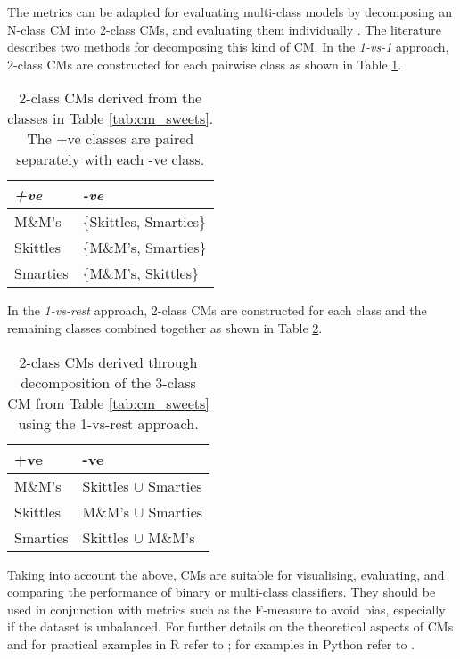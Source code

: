 The metrics can be adapted for evaluating multi-class models by decomposing an N-class CM into 2-class CMs, and evaluating them individually \citep{stager2006dealing}. The literature describes two methods for decomposing this kind of  CM. In the \textit{1-vs-1} approach, 2-class CMs are constructed for each pairwise class as shown in Table \ref{tab:cm_1vs1}.

\begin{table}[ht]
  \centering
  \selectfont
  \begin{tabular}{ll}
    \toprule
    \textit{+ve} & \textit{-ve} \\
    \midrule
    M\&M's       & $\{$Skittles, Smarties$\}$ \\
    Skittles     & $\{$M\&M's, Smarties$\}$ \\
    Smarties     & $\{$M\&M's, Skittles$\}$ \\
    \bottomrule
  \end{tabular}
  \caption{2-class CMs derived from the classes in Table \ref{tab:cm_sweets}. The +ve classes are paired separately with each -ve class.}
  \label{tab:cm_1vs1}
\end{table}

In the \textit{1-vs-rest} approach, 2-class CMs are constructed for each class and the remaining classes combined together as shown in Table \ref{tab:cm_1vsN}.

\begin{table}[ht]
  \centering
  \selectfont
  \begin{tabular}{ll}
    \toprule
    +ve       & -ve \\
    \midrule
    M\&M's    & Skittles $\cup$ Smarties \\
    Skittles  & M\&M's $\cup$ Smarties \\
    Smarties  & Skittles $\cup$ M\&M's \\
    \bottomrule
  \end{tabular}
  \caption{2-class CMs derived through decomposition of the 3-class CM from Table \ref{tab:cm_sweets} using the 1-vs-rest approach.}
  \label{tab:cm_1vsN}
\end{table}

Taking into account the above, CMs are suitable for visualising, evaluating, and comparing the performance of binary or multi-class classifiers. They should be used in conjunction with metrics such as the F-measure to avoid bias, especially if the dataset is unbalanced. For further details on the theoretical aspects of CMs and for practical examples in R refer to \citep{cichosz2014data}; for examples in Python refer to \citep{muller2016introduction}.

